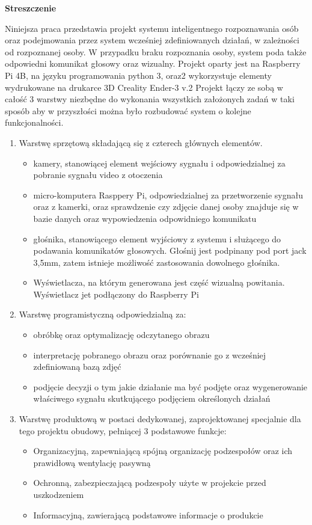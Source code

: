 \documentclass[a4paper,12pt,reqno]{article}
\begin{document}
%
%
\begin{flushleft}
\Large \textbf{Streszczenie}
\end{flushleft}
\vspace{1cm}
Niniejsza praca przedstawia projekt systemu inteligentnego rozpoznawania osób oraz podejmowania przez system wcześniej zdefiniowanych działań, w zależności od rozpoznanej osoby. W przypadku braku rozpoznania osoby, system poda także odpowiedni komunikat głosowy oraz wizualny. 
\newline
Projekt oparty jest na Raspberry Pi 4B, na języku programowania python 3, oraz2 wykorzystuje elementy wydrukowane na drukarce 3D Creality Ender-3 v.2
\newline
Projekt łączy ze sobą w całość 3 warstwy niezbędne do wykonania wszystkich założonych zadań w taki sposób aby w przyszłości można było rozbudować system o kolejne funkcjonalności.
\begin{enumerate} %
  \item Warstwę sprzętową składającą się z czterech głównych elementów.
  \begin{itemize}
  	\item kamery, stanowiącej element wejściowy sygnału i odpowiedzialnej za pobranie sygnału video z otoczenia
  	\item micro-komputera Rasppery Pi, odpowiedzialnej za przetworzenie sygnału oraz z kamerki, oraz sprawdzenie czy zdjęcie danej osoby znajduje się w bazie danych oraz wypowiedzenia odpowidniego komunikatu
  	\item głośnika, stanowiącego element wyjściowy z systemu i służącego do podawania komunikatów głosowych. Głośnij jest podpinany pod port jack 3,5mm, zatem istnieje możliwość zastosowania dowolnego głośnika.
  	\item Wyświetlacza, na którym generowana jest część wizualną powitania. Wyświetlacz jet podłączony do Raspberry Pi
  \end{itemize}
  \item Warstwę programistyczną odpowiedzialną za:
  \begin{itemize}
  	\item obróbkę oraz optymalizację odczytanego obrazu
  	\item interpretację pobranego obrazu oraz porównanie go z wcześniej zdefiniowaną bazą zdjęć
  	\item podjęcie decyzji o tym jakie działanie ma być podjęte oraz wygenerowanie właściwego sygnału skutkującego podjęciem określonych działań
  \end{itemize}
  \item Warstwę produktową w postaci dedykowanej, zaprojektowanej specjalnie dla tego projektu obudowy, pełniącej 3 podstawowe funkcje:
  \begin{itemize}
  	\item Organizacyjną, zapewniającą spójną organizację podzespołów oraz ich prawidłową wentylację pasywną
  	\item Ochronną, zabezpieczającą podzespoły użyte w projekcie przed uszkodzeniem
  	\item Informacyjną, zawierającą podstawowe informacje o produkcie
  \end{itemize}
\end{enumerate}
\end{document}
